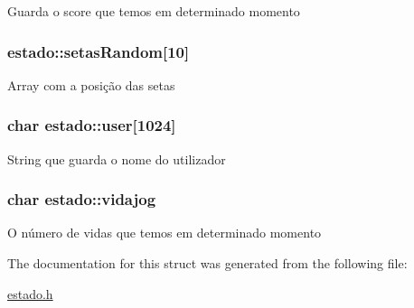 Guarda o score que temos em determinado momento \hypertarget{structestado_aece5339d5a9196c4bf14b209b9355455}{
\subsubsection[{setas\+Random}]{ estado\+::setas\+Random\mbox{[}10\mbox{]}}}\label{structestado_aece5339d5a9196c4bf14b209b9355455}
Array com a posição das setas \hypertarget{structestado_a9abaf37f25e76a0a6b4e02ba30d15119}{
\subsubsection[{user}]{\setlength{\rightskip}{0pt plus 5cm}char estado\+::user\mbox{[}1024\mbox{]}}}\label{structestado_a9abaf37f25e76a0a6b4e02ba30d15119}
String que guarda o nome do utilizador \hypertarget{structestado_a38a9752f3c9a5186d05b28137a1a559a}{
\subsubsection[{vidajog}]{\setlength{\rightskip}{0pt plus 5cm}char estado\+::vidajog}}\label{structestado_a38a9752f3c9a5186d05b28137a1a559a}
O número de vidas que temos em determinado momento 

The documentation for this struct was generated from the following file\+:\begin{DoxyCompactItemize}
\item 
\hyperlink{estado_8h}{estado.\+h}\end{DoxyCompactItemize}

